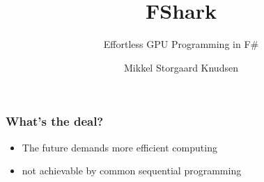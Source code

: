\documentclass[10pt, compress, usenames, dvipsnames]{beamer}
\title{FShark}
\subtitle{Effortless GPU Programming in F\#}
\author{Mikkel Storgaard Knudsen}
\institute{Master's Thesis presentation, University of Copenhagen}
\begin{document}
\maketitle

\begin{frame}[fragile]
\frametitle{What's the deal?}
\pause
\begin{itemize}
\item<+-> The future demands more efficient computing
\item<+-> not achievable by common sequential programming 
\end{itemize}
\pause 



\end{frame}
\end{document}
